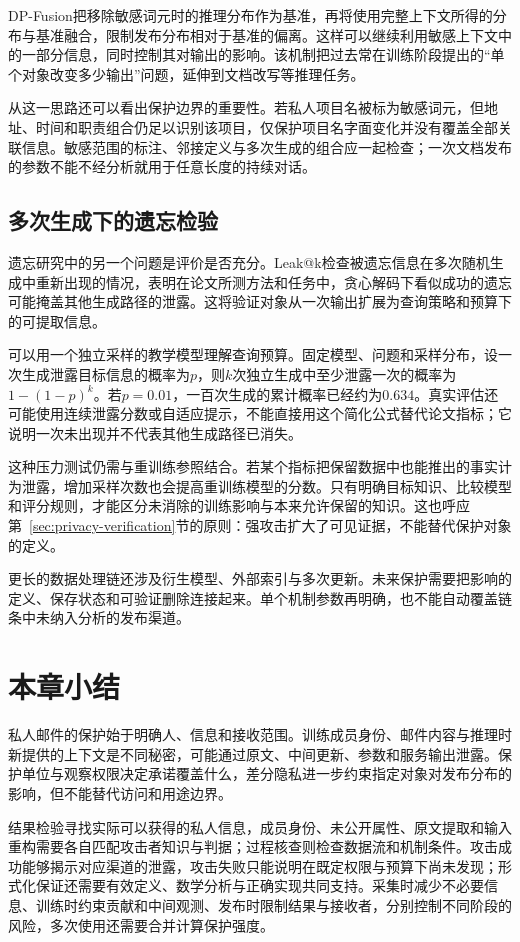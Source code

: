 DP-Fusion把移除敏感词元时的推理分布作为基准，再将使用完整上下文所得的分布与基准融合，限制发布分布相对于基准的偏离。这样可以继续利用敏感上下文中的一部分信息，同时控制其对输出的影响。该机制把过去常在训练阶段提出的“单个对象改变多少输出”问题，延伸到文档改写等推理任务。

从这一思路还可以看出保护边界的重要性。若私人项目名被标为敏感词元，但地址、时间和职责组合仍足以识别该项目，仅保护项目名字面变化并没有覆盖全部关联信息。敏感范围的标注、邻接定义与多次生成的组合应一起检查；一次文档发布的参数不能不经分析就用于任意长度的持续对话。

\subsection{多次生成下的遗忘检验}

遗忘研究中的另一个问题是评价是否充分。Leak@k检查被遗忘信息在多次随机生成中重新出现的情况，表明在论文所测方法和任务中，贪心解码下看似成功的遗忘可能掩盖其他生成路径的泄露。这将验证对象从一次输出扩展为查询策略和预算下的可提取信息。

可以用一个独立采样的教学模型理解查询预算。固定模型、问题和采样分布，设一次生成泄露目标信息的概率为$p$，则$k$次独立生成中至少泄露一次的概率为$1-(1-p)^k$。若$p=0.01$，一百次生成的累计概率已经约为$0.634$。真实评估还可能使用连续泄露分数或自适应提示，不能直接用这个简化公式替代论文指标；它说明一次未出现并不代表其他生成路径已消失。

这种压力测试仍需与重训练参照结合。若某个指标把保留数据中也能推出的事实计为泄露，增加采样次数也会提高重训练模型的分数。只有明确目标知识、比较模型和评分规则，才能区分未消除的训练影响与本来允许保留的知识。这也呼应第~\ref{sec:privacy-verification}节的原则：强攻击扩大了可见证据，不能替代保护对象的定义。

更长的数据处理链还涉及衍生模型、外部索引与多次更新。未来保护需要把影响的定义、保存状态和可验证删除连接起来。单个机制参数再明确，也不能自动覆盖链条中未纳入分析的发布渠道。

\section{本章小结}
\label{sec:privacy-summary}

私人邮件的保护始于明确人、信息和接收范围。训练成员身份、邮件内容与推理时新提供的上下文是不同秘密，可能通过原文、中间更新、参数和服务输出泄露。保护单位与观察权限决定承诺覆盖什么，差分隐私进一步约束指定对象对发布分布的影响，但不能替代访问和用途边界。

结果检验寻找实际可以获得的私人信息，成员身份、未公开属性、原文提取和输入重构需要各自匹配攻击者知识与判据；过程核查则检查数据流和机制条件。攻击成功能够揭示对应渠道的泄露，攻击失败只能说明在既定权限与预算下尚未发现；形式化保证还需要有效定义、数学分析与正确实现共同支持。采集时减少不必要信息、训练时约束贡献和中间观测、发布时限制结果与接收者，分别控制不同阶段的风险，多次使用还需要合并计算保护强度。


